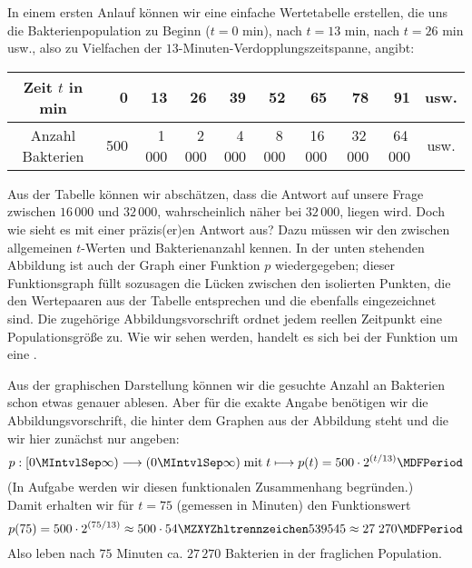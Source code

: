 \begin{MIntro}
\begin{MExample}
In einem ersten Anlauf können wir eine einfache Wertetabelle erstellen, die uns die Bakterienpopulation zu Beginn ($t = 0$ min),
nach $t = 13$ min, nach $t = 26$ min usw., also zu Vielfachen der $13$-Minuten-Verdopplungszeitspanne, angibt:
\begin{center}
 \begin{tabular}{|c|r|r|r|r|r|r|r|r|c|}
 \hline
 Zeit $t$ in min & 0 & 13 & 26 & 39 & 52 & 65 & 78 & 91 & usw. \\ \hline
 Anzahl Bakterien & 500 & 1\,000 & 2\,000 & 4\,000 & 8\,000 & 16\,000 & 32\,000 & 64\,000 & usw. \\ 
 \hline
 \end{tabular}
\end{center}
Aus der Tabelle können wir abschätzen, dass die Antwort auf unsere Frage zwischen
$16\,000$ und $32\,000$, wahrscheinlich näher bei $32\,000$, liegen wird. Doch wie sieht es mit einer präzis(er)en Antwort aus?
Dazu müssen wir den  zwischen allgemeinen $t$-Werten und Bakterienanzahl kennen. In der
unten stehenden Abbildung ist auch der Graph einer Funktion $p$ wiedergegeben; dieser Funktionsgraph füllt sozusagen die
Lücken zwischen den isolierten Punkten, die den Wertepaaren aus der Tabelle entsprechen und die ebenfalls eingezeichnet
sind. Die zugehörige Abbildungsvorschrift ordnet jedem reellen Zeitpunkt eine Populationsgröße zu. Wie wir sehen werden,
handelt es sich bei der Funktion um eine .
\begin{center}
\end{center}
Aus der graphischen Darstellung können wir die gesuchte Anzahl an Bakterien schon etwas genauer ablesen. Aber für die
exakte Angabe benötigen wir die Abbildungsvorschrift, die hinter dem Graphen aus der Abbildung steht und die wir hier
zunächst nur angeben:
$$p: [0\MIntvlSep \infty) \longrightarrow (0\MIntvlSep  \infty) \;\text{mit}\; t \longmapsto p(t) = 500 \cdot 2^{(t/13)} \MDFPeriod$$
(In Aufgabe  werden wir diesen funktionalen Zusammenhang begründen.)\\
Damit erhalten wir für $t = 75$ (gemessen in Minuten) den Funktionswert
$$p(75) = 500 \cdot 2^{(75/13)} \approx 500 \cdot \MZahl{54}{539545} \approx 27\;270 \MDFPeriod$$
Also leben nach $75$ Minuten ca. $27\,270$ Bakterien in der fraglichen Population.
\end{MExample}
\end{MIntro}


